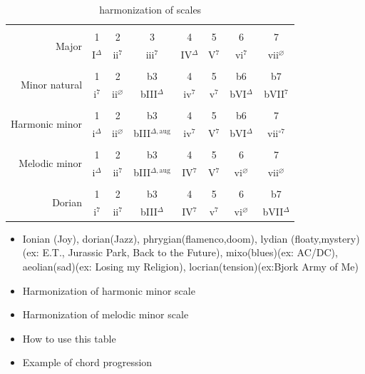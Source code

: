 \documentclass{article}
\begin{document}
\begin{table}[!h]
	\caption{harmonization of scales}
	\begin{adjustwidth}{0cm}{}
	\begin{tabular}{r|ccc cccc}
		\hline \vspace{-0.4cm} \\
		\multirow{2}{*}{Major}          & 1 & 2 & 3 & 4 & 5 & 6 & 7\\ 
		                                & I$^\Delta$ & ii$^{7}$ & iii$^{7}$ & IV$^\Delta$ & V$^7$ & vi$^{7}$ & vii$^{\varnothing}$ \\
		\hline \vspace{-0.2cm} \\
		\multirow{2}{*}{Minor natural} & 1 & 2 & b3 & 4 & 5 & b6 & b7\\ 
		                                & i$^7$ & ii$^{\varnothing}$ & bIII$^{\Delta}$ & iv$^7$ & v$^7$ & bVI$^{\Delta}$ & bVII$^{7}$ \\
		\hline \vspace{-0.2cm} \\
		\multirow{2}{*}{Harmonic minor} & 1 & 2 & b3 & 4 & 5 & b6 & 7\\ 
		                                & i$^{\Delta}$ & ii$^{\varnothing}$ & bIII$^{\Delta, \textrm{aug}}$ & iv$^7$ & V$^7$ & bVI$^{\Delta}$ & vii$^{\circ 7}$ \\
		\hline \vspace{-0.2cm} \\
		\multirow{2}{*}{Melodic minor} & 1 & 2 & b3 & 4 & 5 & 6 & 7\\ 
			                           & i$^{\Delta}$ & ii$^{7}$ & bIII$^{\Delta, \textrm{aug}}$ & IV$^7$ & V$^7$ & vi$^{\varnothing}$ & vii$^{\varnothing}$ \\
			                           \hline \vspace{-0.2cm} \\
		\multirow{2}{*}{Dorian}        & 1 & 2 & b3 & 4 & 5 & 6 & b7\\ 
			                           & i$^{7}$ & ii$^{7}$ & bIII$^{\Delta}$ & IV$^7$ & v$^7$ & vi$^{\varnothing}$ & bVII$^{\Delta}$ \\
		\hline 
	\end{tabular}
	\label{tab: }
	\end{adjustwidth}
\end{table}

\begin{itemize}
	\item Ionian (Joy), dorian(Jazz), phrygian(flamenco,doom), lydian (floaty,mystery) (ex: E.T., Jurassic Park, Back to the Future), mixo(blues)(ex: AC/DC), aeolian(sad)(ex: Losing my Religion), locrian(tension)(ex:Bjork Army of Me) 
	\item Harmonization of harmonic minor scale
	\item Harmonization of melodic minor scale
	\item How to use this table
	\item Example of chord progression
\end{itemize}
\end{document}
